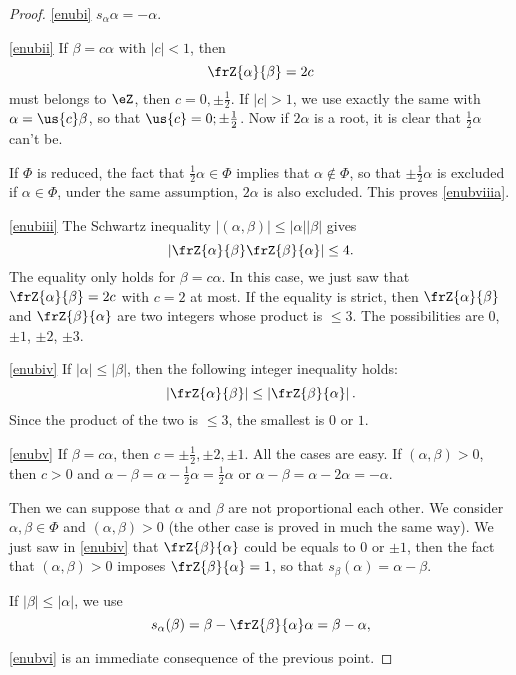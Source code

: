\begin{proof}
\ref{enubi} $s_{\alpha}\alpha=-\alpha$.

\ref{enubii} If $\beta=c\alpha$ with $|c|<1$, then 
\[
\frZ{\alpha}{\beta}=2c
\]
must belongs to $\eZ$, then $c=0,\pm\frac{1}{2}$. If $|c|>1$, we use exactly the same with $\alpha=\us{c}\beta$, so that $\us{c}=0;\pm\frac{1}{2}$. Now if $2\alpha$ is a root, it is clear that $\frac{1}{2}\alpha$ can't be.

If $\Phi$ is reduced, the fact that $\frac{1}{2}\alpha\in\Phi$ implies that $\alpha\notin\Phi$, so that $\pm\frac{1}{2}\alpha$ is excluded if $\alpha\in\Phi$, under the same assumption, $2\alpha$ is also excluded. This proves \ref{enubviiia}.

\ref{enubiii} The Schwartz inequality $|(\alpha,\beta)|\leq|\alpha||\beta|$ gives
\[
\left|   \frZ{\alpha}{\beta}\frZ{\beta}{\alpha}     \right|\leq 4.
\]
The equality only holds for $\beta=c\alpha$. In this case, we just saw that $\frZ{\alpha}{\beta}=2c$ with $c=2$ at most. If the equality is strict, then $\frZ{\alpha}{\beta}$ and $\frZ{\beta}{\alpha}$ are two integers whose product is $\leq 3$. The possibilities are $0$, $\pm 1$, $\pm 2$, $\pm 3$.

\ref{enubiv} If $|\alpha|\leq|\beta|$, then the following integer inequality holds:
\[
\left|\frZ{\alpha}{\beta}   \right|\leq\left|\frZ{\beta}{\alpha}   \right|.
\]
Since the product of the two  is $\leq 3$, the smallest is $0$ or $1$.

\ref{enubv}
If $\beta=c\alpha$, then $c=\pm\frac{1}{2},\pm 2,\pm 1$. All the cases are easy. If $(\alpha,\beta)>0$, then $c>0$ and $\alpha-\beta= \alpha-\frac{1}{2}\alpha=\frac{1}{2}\alpha$ or $\alpha-\beta=\alpha-2\alpha=-\alpha$.

Then we can suppose that $\alpha$ and $\beta$ are not proportional each other. We consider $\alpha,\beta\in\Phi$ and $(\alpha,\beta)>0$ (the other case is proved in much the same way). We just saw in \ref{enubiv} that $\frZ{\beta}{\alpha}$ could be equals to $0$ or $\pm 1$, then the fact that $(\alpha,\beta)>0$ imposes $\frZ{\beta}{\alpha}=1$, so that $s_{\beta}(\alpha)=\alpha-\beta$.

If $|\beta|\leq|\alpha|$, we use
\begin{equation}
s_{\alpha}(\beta)=\beta-\frZ{\beta}{\alpha}\alpha
               =\beta-\alpha,
\end{equation}

\ref{enubvi} is an immediate consequence of the previous point.


\end{proof}
